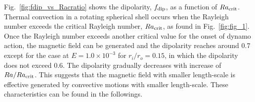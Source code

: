 {\color{red}
Fig.~\ref{fig:fdip_vs_Racratio} shows the dipolarity, $f_{\rm dip}$, as a function of $Ra_{\rm crit}$.
Thermal convection in a rotating spherical shell occurs when the Rayleigh number exceeds the critical Rayleigh number, $Ra_{\rm crit}$, as found in Fig.~\ref{fig:fig_1}.
Once the Rayleigh number exceeds another critical value for the onset of dynamo action, the magnetic field can be generated and the dipolarity reaches around 0.7 except for the case at $E = 1.0 \times 10^{-3}$ for $r_i/r_o = 0.15$, in which the dipolarity does not exceed 0.6.
The dipolarity gradually decreases with increase of $Ra / Ra_{\rm crit}$.
This suggests that the magnetic field with smaller length-scale is effective generated by convective motions with smaller length-scale.
These characteristics can be found in the followings.
}



